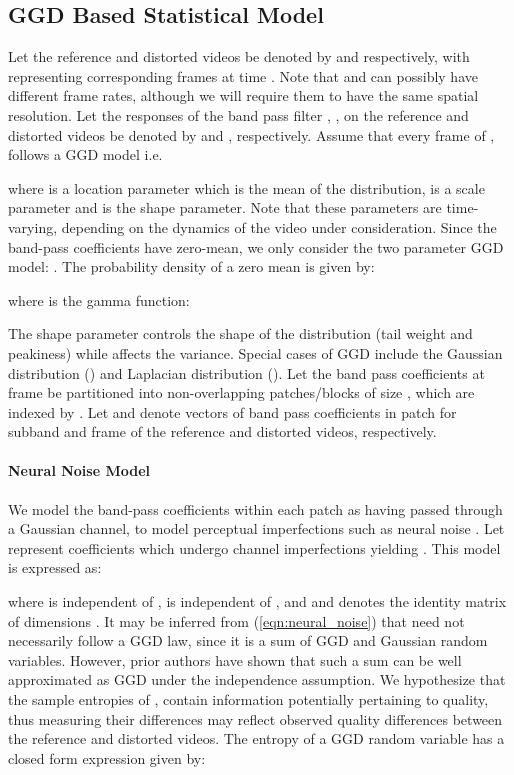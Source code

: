 \documentclass[journal]{IEEEtran}
\newcommand{\ie}{{i}.{e}.}
\begin{document}
\subsection{GGD Based Statistical Model}
\label{subsec:GGD_model}
Let the reference and distorted videos be denoted by  and  respectively, with  representing corresponding frames at time . Note that  and  can possibly have different frame rates, although we will require them to have the same spatial resolution. Let the responses of the  band pass filter , , on the reference and distorted videos be denoted by  and , respectively. Assume that every frame of ,  follows a GGD model \ie{ } 

where  is a location parameter which is the mean of the distribution,  is a scale parameter and  is the shape parameter. Note that these parameters are time-varying, depending on the dynamics of the video under consideration. Since the band-pass coefficients have zero-mean, we only consider the two parameter GGD model: . The probability density of a zero mean  is given by:

where  is the gamma function:


The shape parameter  controls the shape of the distribution (tail weight and peakiness) while  affects the variance. Special cases of GGD include the Gaussian distribution () and Laplacian distribution (). Let the band pass coefficients at frame  be partitioned into non-overlapping patches/blocks of size , which are indexed by . Let  and  denote vectors of band pass coefficients in patch  for subband  and frame  of the reference and distorted videos, respectively. 

\paragraph*{\textbf{Neural Noise Model}} We model the band-pass coefficients within each patch as having passed through a Gaussian channel, to model perceptual imperfections such as neural noise \cite{sheikh2006image,soundararajan2012video}. Let  represent coefficients which undergo channel imperfections yielding . This model is expressed as:

where  is independent of ,  is independent of ,  and  and  denotes the identity matrix of dimensions . It may be inferred from (\ref{eqn:neural_noise}) that  need not necessarily follow a GGD law, since it is a sum of GGD and Gaussian random variables. However, prior authors \cite{zhao2004sum,soury2015new} have shown that such a sum can be well approximated as GGD under the independence assumption. We hypothesize that the sample entropies of , contain information potentially pertaining to quality, thus measuring their differences may reflect observed quality differences between the reference and distorted videos. The entropy of a GGD random variable  has a closed form expression given by:
\end{document}
